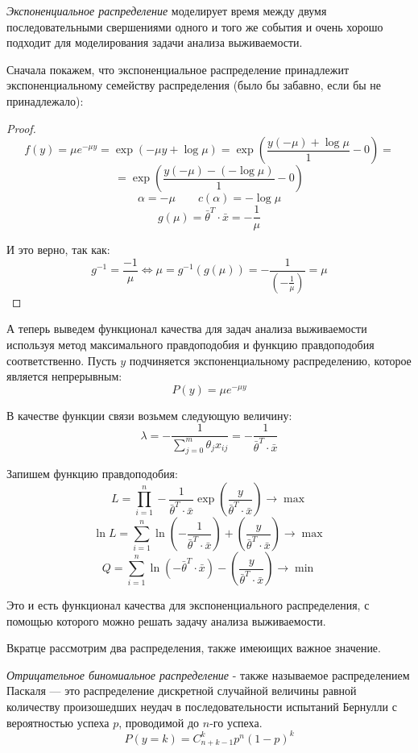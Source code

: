\documentclass[aps,%
12pt,%
final,%
oneside,
onecolumn,%
musixtex, %
superscriptaddress,%
centertags]{article} %
\theoremstyle{plain}
\theoremstyle{definition}
\theoremstyle{remark}
\begin{document}
\textit{Экспоненциальное распределение} моделирует время между двумя последовательными свершениями одного и того же события и очень хорошо подходит для моделирования задачи анализа выживаемости.

Сначала покажем, что экспоненциальное распределение принадлежит экспоненциальному семейству распределения (было бы забавно, если бы не принадлежало):
\begin{proof}
$$f(y)=\mu e^{-\mu y} = \exp(-\mu y + \log \mu) = \exp \left( \frac{y(-\mu)+\log \mu}{1}- 0\right ) =  $$
$$ = \exp \left( \frac{y(-\mu)- (-\log \mu)}{1} - 0\right)$$
$$\alpha = -\mu \qquad c(\alpha) = -\log \mu$$
$$g(\mu) = \left .\bar{\theta}\right .^T \cdot \bar{x} = - \frac{1}{\mu}$$

И это верно, так как:
$$g^{-1} = \frac{-1}{\mu} \Leftrightarrow \mu = g^{-1}(g(\mu)) = -\frac{1}{\left(-\frac{1}{\mu}\right)} = \mu$$
\end{proof}

А теперь выведем функционал качества для задач анализа выживаемости используя метод максимального правдоподобия и функцию правдоподобия соответственно. Пусть $y$ подчиняется экспоненциальному распределению, которое является непрерывным:
$$P(y) = \mu e^{-\mu y}$$

В качестве функции связи возьмем следующую величину:
$$\lambda = -\frac{1}{\sum\limits_{j=0}^m \theta_j x_{ij}} = -\frac{1}{\left .\bar{\theta}\right .^T \cdot \bar{x}}$$

Запишем функцию правдоподобия:
$$L = \prod_{i=1}^n -\frac{1}{\left .\bar{\theta}\right .^T \cdot \bar{x}} \exp \left(\frac{y}{\left .\bar{\theta}\right .^T \cdot \bar{x}}\right) \to \max$$
$$\ln L = \sum\limits_{i=1}^n \ln\left(-\frac{1}{\left .\bar{\theta}\right .^T \cdot \bar{x}}\right) + \left(\frac{y}{\left .\bar{\theta}\right .^T \cdot \bar{x}}\right) \to \max$$ 
$$Q = \sum\limits_{i=1}^n \ln\left(-\left .\bar{\theta}\right .^T \cdot \bar{x}\right) - \left(\frac{y}{\left .\bar{\theta}\right .^T \cdot \bar{x}}\right) \to \min$$

Это и есть функционал качества для экспоненциального распределения, с помощью которого можно решать задачу анализа выживаемости.

Вкратце рассмотрим два распределения, также имеюищих важное значение.

\textit{Отрицательное биномиальное распределение} -  также называемое распределением Паскаля — это распределение дискретной случайной величины равной количеству произошедших неудач в последовательности испытаний Бернулли с вероятностью успеха $p$, проводимой до $n$-го успеха.
$$P(y=k) = C_{n+k-1}^k p^n(1-p)^k$$
\end{document}
